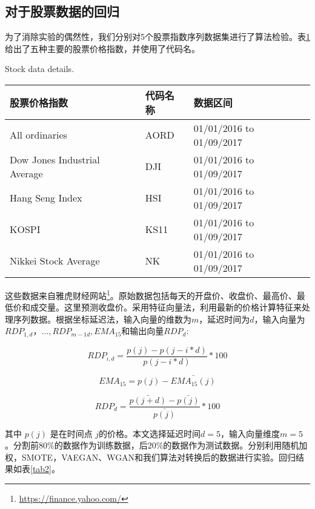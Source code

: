 \subsection{对于股票数据的回归}

为了消除实验的偶然性，我们分别对5个股票指数序列数据集进行了算法检验。表\ref{tab1}给出了五种主要的股票价格指数，并使用了代码名。
\begin{table}[htpb]
	\centering
	{Stock data details.}
	\label{tab1}
	\begin{tabular}{lll} \toprule
		股票价格指数   & 代码名称 &  数据区间  \\  \midrule
		All ordinaries   & AORD&  01/01/2016 to 01/09/2017 \\
		Dow Jones Industrial Average   & DJI&01/01/2016 to 01/09/2017\\
		Hang Seng Index   & HSI&   01/01/2016 to 01/09/2017\\
		KOSPI   & KS11& 01/01/2016 to 01/09/2017\\
		Nikkei Stock Average   &NK&   01/01/2016 to 01/09/2017\\
		\bottomrule
	\end{tabular}
\end{table}
这些数据来自雅虎财经网站\footnote{\url{https://finance.yahoo.com/}}。原始数据包括每天的开盘价、收盘价、最高价、最低价和成交量。这里预测收盘价。采用特征向量法\cite{18}，利用最新的价格计算特征来处理序列数据。根据坐标延迟法，输入向量的维数为$m$，延迟时间为$d$，输入向量为$RDP_{1,d}，…,RDP_ {m - 1 d}, EMA_{15}$和输出向量$RDP_ {d} $:

\begin{equation}
\label{eq16}
RDP_{i,d} = \frac{p(j)-p(j-i*d)}{p(j-i*d)}*100
\end{equation}


\begin{equation}
\label{eq17}
EMA_{15}  = p(j)-\bar{EMA_{15}(j)}
\end{equation}

\begin{equation}
\label{eq18}
RDP_{d} = \frac{\bar{p(j+d)}-\bar{p(j)}}{\bar{p(j)}}*100
\end{equation}


其中 $p(j)$ 是在时间点 $j$的价格。本文选择延迟时间$d=5$，输入向量维度$m=5$。分割前$80\% $的数据作为训练数据，后$20\% $的数据作为测试数据。分别利用随机加权，SMOTE，VAEGAN、WGAN和我们算法对转换后的数据进行实验。回归结果如表\ref{tab2}。

